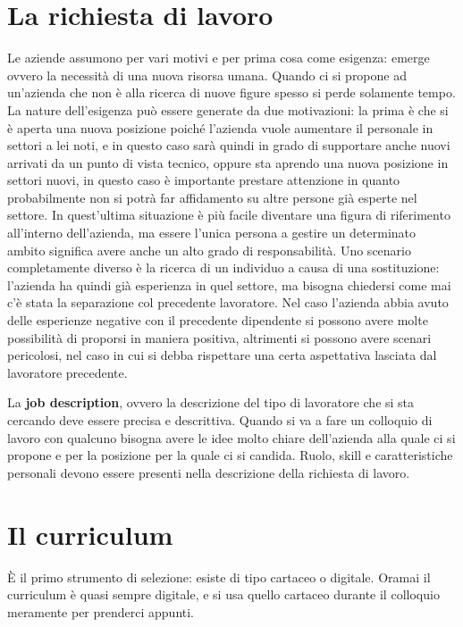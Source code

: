 \section{La richiesta di lavoro}
Le aziende assumono per vari motivi e per prima cosa come esigenza: emerge
ovvero la necessità di una nuova risorsa umana. Quando ci si propone ad
un'azienda che non è alla ricerca di nuove figure spesso si perde
solamente tempo. La nature dell'esigenza può essere generate da due
motivazioni: la prima è che si è aperta una nuova posizione poiché l'azienda
vuole aumentare il personale in settori a lei noti, e in questo caso sarà
quindi in grado di supportare anche nuovi arrivati da un punto di vista tecnico,
oppure sta aprendo una nuova posizione in settori nuovi, in questo
caso è importante prestare attenzione in quanto probabilmente non si potrà far
affidamento su altre persone già esperte nel settore. In quest'ultima situazione
è più facile diventare una figura di riferimento all'interno dell'azienda, ma
essere l'unica persona a gestire un determinato ambito significa avere anche un
alto grado di responsabilità. Uno scenario completamente diverso è la ricerca
di un individuo a causa di una sostituzione: l'azienda ha quindi già esperienza
in quel settore, ma bisogna chiedersi come mai c'è stata la separazione col
precedente lavoratore. Nel caso l'azienda abbia avuto delle esperienze negative
con il precedente dipendente si possono avere molte possibilità di proporsi in
maniera positiva, altrimenti si possono avere scenari pericolosi, nel caso in
cui si debba rispettare una certa aspettativa lasciata dal lavoratore
precedente.

La \textbf{job description}, ovvero la descrizione del tipo di lavoratore che
si sta cercando deve essere precisa e descrittiva. Quando si va a fare un
colloquio di lavoro con qualcuno bisogna avere le idee molto chiare
dell'azienda alla quale ci si propone e per la posizione per la quale ci si
candida. Ruolo, skill e caratteristiche personali devono essere presenti nella
descrizione della richiesta di lavoro.

\section{Il curriculum}
È il primo strumento di selezione: esiste di tipo cartaceo o digitale. Oramai
il curriculum è quasi sempre digitale, e si usa quello cartaceo durante il
colloquio meramente per prenderci appunti.

